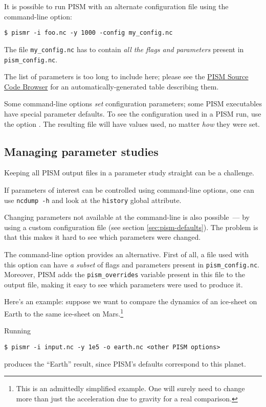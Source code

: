 It is possible to run PISM with an alternate configuration file using the  command-line option:
\begin{verbatim}
$ pismr -i foo.nc -y 1000 -config my_config.nc
\end{verbatim}

The file \texttt{my_config.nc} has to contain \emph{all the flags and parameters} present in \texttt{pism_config.nc}.

The list of parameters is too long to include here; please see the \href{http://www.pism-docs.org/doxy/html/index.html}{PISM Source Code Browser} for an automatically-generated table describing them.

Some command-line options \emph{set} configuration parameters; some PISM
executables have special parameter defaults. To see the configuration used in a
PISM run, use the option . The resulting file will have values
used, no matter \emph{how} they were set.

\subsection{Managing parameter studies}
\label{sec:parameter-studies}
Keeping all PISM output files in a parameter study straight can be a challenge.

If parameters of interest can be controlled using command-line options, one can use \texttt{ncdump -h} and look at the \texttt{history} global attribute.

Changing parameters not available at the command-line is also possible~--- by using a custom configuration file (see section \ref{sec:pism-defaults}). The problem is that this makes it hard to see which parameters were changed.

The  command-line option provides an alternative. First of all, a file used with this option can have \emph{a subset} of flags and parameters present in \texttt{pism_config.nc}. Moreover, PISM adds the \texttt{pism_overrides} variable present in this file to the output file, making it easy to see which parameters were used to produce it.

Here's an example: suppose we want to compare the dynamics of an ice-sheet on Earth to the same ice-sheet on Mars.\footnote{This is an admittedly simplified example. One will surely need to change more than just the acceleration due to gravity for a real comparison.}

Running
\begin{verbatim}
$ pismr -i input.nc -y 1e5 -o earth.nc <other PISM options>
\end{verbatim}
produces the ``Earth'' result, since PISM's defaults correspond to this planet.

